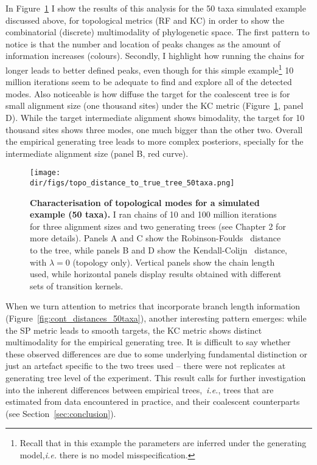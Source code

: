 In Figure~\ref{fig:topo_distances_50taxa} I show the results of this analysis for the 50 taxa simulated example discussed above, for topological metrics (RF and KC)  in order to show the combinatorial (discrete) multimodality of phylogenetic space.
The first pattern to notice is that the number and location of peaks changes as the amount of information increases (colours).
Secondly, I highlight how running the chains for longer leads to better defined peaks, even though for this simple example\footnote{Recall that in this example the parameters are inferred under the generating model,\textit{i.e.} there is no model misspecification.} 10 million iterations seem to be adequate to find and explore all of the detected modes.
Also noticeable is how diffuse the target for the coalescent tree is for small alignment size (one thousand sites) under the KC metric (Figure~\ref{fig:topo_distances_50taxa}, panel D).
While the target intermediate alignment shows bimodality, the target for 10 thousand sites shows three modes, one much bigger than the other two.
Overall the empirical generating tree leads to more complex posteriors, specially for the intermediate alignment size (panel B, red curve).

\begin{figure}[!ht]
\begin{center}
\texttt{[image: \\dir/figs/topo\_distance\_to\_true\_tree\_50taxa.png]} 
\end{center}
 \caption[Characterisation of topological modes for a simulated example (50 taxa).]{\textbf{Characterisation of topological modes for a simulated example (50 taxa).}
  I ran chains of 10 and 100 million iterations for three alignment sizes and two generating trees (see Chapter 2 for more details).
 Panels A and C show the Robinson-Foulds~\citep{Robinson1981} distance to the tree, while panels B and D show the Kendall-Colijn~\citep{Kendall2016} distance, with $\lambda =0$ (topology only). 
 Vertical panels show the chain length used, while horizontal panels display results obtained with different sets of transition kernels.
 }
 \label{fig:topo_distances_50taxa}
\end{figure}

When we turn attention to metrics that incorporate branch length information (Figure~\ref{fig:cont_distances_50taxa}), another interesting pattern emerges: while the SP metric leads to smooth targets, the KC metric shows distinct multimodality for the empirical generating tree.
It is difficult to say whether these observed differences are due to some underlying fundamental distinction or just an artefact specific to the two trees used -- there were not replicates at generating tree level of the experiment.
This result calls for further investigation into the inherent differences between empirical trees,~\textit{i.e.}, trees that are estimated from data encountered in practice, and their coalescent counterparts (see Section~\ref{sec:conclusion}).

